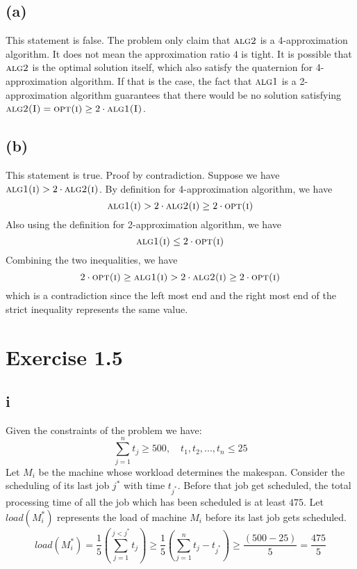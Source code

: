 \documentclass[11pt]{article}
\begin{document}
\subsection*{(a)} \noindent
This statement is false.
\newline 
The problem only claim that $\textsc{alg2}$ is a 4-approximation algorithm. It does not mean the approximation ratio $4$ is tight. 
It is possible that $\textsc{alg2}$ is the optimal solution itself, which also satisfy the quaternion for 4-approximation algorithm. 
If that is the case, the fact that $\textsc{alg1}$ is a 2-approximation algorithm guarantees that there would be no solution satisfying 
$\textsc{alg2(I)} = \textsc{opt(i)} \geq 2 \cdot \textsc{alg1(I)}$.
\subsection*{(b)} \noindent
This statement is true.
\newline
Proof by contradiction. Suppose we have $\textsc{alg1(i)} > 2 \cdot \textsc{alg2(i)}$. By definition for 4-approximation algorithm, we have 
\[
\textsc{alg1(i)} > 2 \cdot \textsc{alg2(i)} \geq 2 \cdot \textsc{opt(i)}
\]
Also using the definition for 2-approximation algorithm, we have
\[
\textsc{alg1(i)} \leq 2 \cdot \textsc{opt(i)}
\]
Combining the two inequalities, we have
\[
2 \cdot \textsc{opt(i)} \geq \textsc{alg1(i)} > 2 \cdot \textsc{alg2(i)} \geq 2 \cdot \textsc{opt(i)}
\]
which is a contradiction since the left most end and the right most end of the strict inequality represents the same value. 

\section*{Exercise 1.5}
\subsection*{i} \noindent
Given the constraints of the problem we have:
\[ 
\sum_{j=1}^{n} t_{j} \geq 500, \quad t_{1}, t_{2}, ..., t_{n} \leq 25
\]
Let $M_{i}$ be the machine whose workload determines the makespan. 
Consider the scheduling of its last job $j^{*}$ with time $t_{j^{*}}$. Before that job get scheduled, 
the total processing time of all the job which has been scheduled is at least $475$.
\newline
Let $load(M_{i}^{*})$ represents the load of machine $M_{i}$ before its last job gets scheduled. 
\[ load(M_{i}^{*}) = 
\frac{1}{5}(\sum_{j=1}^{j < j^{*}} t_{j}) \geq \frac{1}{5}(\sum_{j=1}^{n} t_{j}- t_{j^{*}}) 
\geq \frac{(500 - 25)}{5} = \frac{475}{5}
\]
\end{document}
